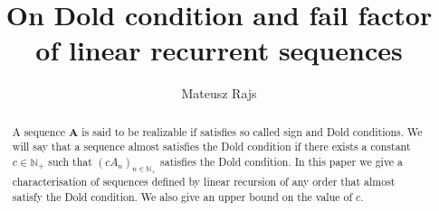 \documentclass[preprint,12pt]{elsarticle}
\newcommand{\N}{\mathbb{N}}
\begin{document}
\begin{frontmatter}



    \title{On Dold condition and fail factor of linear recurrent sequences}


\author{Mateusz Rajs} %


\begin{abstract}
 A sequence $\mathbf{A}$ is said to be realizable if satisfies so called sign and Dold conditions. We will say that a sequence almost satisfies the Dold condition if there exists a constant $c\in\N_+$ such that $(cA_n)_{n\in\N_+}$ satisfies the Dold condition. In this paper we give a characterisation of sequences defined by linear recursion of any order that almost satisfy the Dold condition. We also give an upper bound on the value of $c$. 
 


\end{abstract}
\end{frontmatter}
\end{document}

